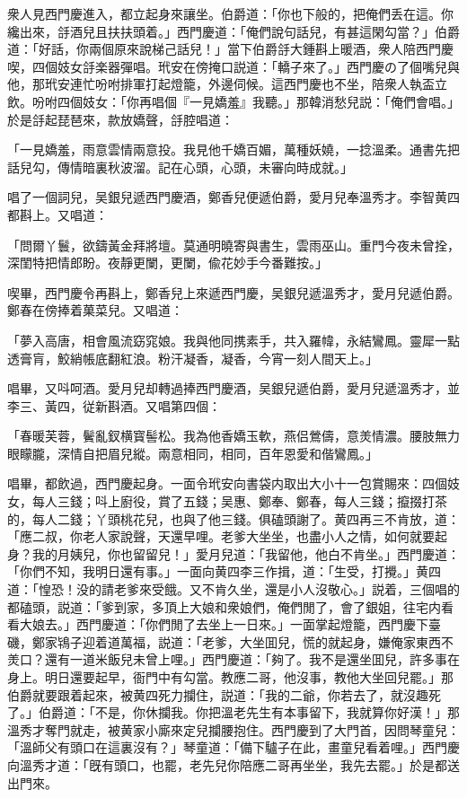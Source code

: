 衆人見西門慶進入，都立起身來讓坐。伯爵道：「你也下般的，把俺們丢在這。你纔出來，㧱酒兒且扶扶頭着。」西門慶道：「俺們說句話兒，有甚這閑勾當？」伯爵道：「好話，你兩個原來說梯己話兒！」當下伯爵㧱大鍾斟上暖酒，衆人陪西門慶喫，四個妓女㧱楽器彈唱。玳安在傍掩口説道：「轎子來了。」西門慶の了個嘴兒與他，那玳安連忙吩咐排軍打起燈籠，外邊伺候。這西門慶也不坐，陪衆人執盃立飲。吩咐四個妓女：「你再唱個『一見嬌羞』我聽。」那韓消愁兒説：「俺們會唱。」於是㧱起琵琶來，款放嬌聲，㧱腔唱道：

\begin{myquote}
「一見嬌羞，雨意雲情兩意投。我見他千嬌百媚，萬種妖嬈，一捻溫柔。通書先把話兒勾，傳情暗裏秋波溜。記在心頭，心頭，未審向時成就。」
\end{myquote}

唱了一個詞兒，吴銀兒遞西門慶酒，鄭香兒便遞伯爵，愛月兒奉溫秀才。李智黄四都斟上。又唱道：

\begin{myquote}
「問爾丫鬟，欲鑄黃金拜將壇。莫通明曉寄與書生，雲雨巫山。重門今夜未曾拴，深閨特把情郎盼。夜靜更闌，更闌，偸花妙手今番難按。」
\end{myquote}

喫畢，西門慶令再斟上，鄭香兒上來遞西門慶，吴銀兒遞溫秀才，愛月兒遞伯爵。鄭春在傍捧着菓菜兒。又唱道：

\begin{myquote}
「夢入高唐，相會風流窈窕娘。我與他同携素手，共入羅幃，永結鸞鳳。靈犀一點透膏肓，鮫綃帳底翻紅浪。粉汗凝香，凝香，今宵一刻人間天上。」
\end{myquote}

唱畢，又呌呵酒。愛月兒却轉過捧西門慶酒，吴銀兒遞伯爵，愛月兒遞溫秀才，並李三、黃四，従新斟酒。又唱第四個：

\begin{myquote}
「春暖芙蓉，鬢亂釵横寳髻松。我為他香嬌玉軟，燕侣鶯儔，意羙情濃。腰肢無力眼矇朧，深情自把眉兒縱。兩意相同，相同，百年恩愛和偕鸞鳳。」
\end{myquote}

唱畢，都飲過，西門慶起身。一面令玳安向書袋内取出大小十一包賞賜來：四個妓女，每人三錢；呌上廚役，賞了五錢；吴惠、鄭奉、鄭春，每人三錢；攛掇打茶的，每人二錢；丫頭桃花兒，也與了他三錢。俱磕頭謝了。黄四再三不肯放，道：「應二叔，你老人家說聲，天還早哩。老爹大坐坐，也盡小人之情，如何就要起身？我的月姨兒，你也留留兒！」愛月兒道：「我留他，他白不肯坐。」西門慶道：「你們不知，我明日還有事。」一面向黄四李三作揖，道：「生受，打攪。」黄四道：「惶恐！没的請老爹來受餓。又不肯久坐，還是小人沒敬心。」説着，三個唱的都磕頭，説道：「爹到家，多頂上大娘和衆娘們，俺們閒了，會了銀姐，往宅内看看大娘去。」西門慶道：「你們閒了去坐上一日來。」一面掌起燈籠，西門慶下臺磯，鄭家鴇子迎着道萬福，説道：「老爹，大坐囬兒，慌的就起身，嫌俺家東西不羙口？還有一道米飯兒未曾上哩。」西門慶道：「夠了。我不是還坐囬兒，許多事在身上。明日還要起早，衙門中有勾當。教應二哥，他沒事，教他大坐回兒罷。」那伯爵就要跟着起來，被黄四死力攔住，説道：「我的二爺，你若去了，就沒趣死了。」伯爵道：「不是，你休攔我。你把溫老先生有本事留下，我就算你好漢！」那溫秀才奪門就走，被黄家小廝來定兒攔腰抱住。西門慶到了大門首，因問琴童兒：「溫師父有頭口在這裏沒有？」琴童道：「備下驢子在此，畫童兒看着哩。」西門慶向溫秀才道：「旣有頭口，也罷，老先兒你陪應二哥再坐坐，我先去罷。」於是都送出門來。

